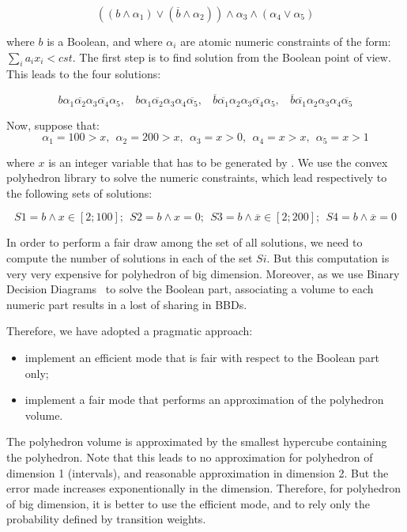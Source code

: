 $$ ((b \wedge \alpha_1) \vee (\overline{b} \wedge \alpha_2)) \wedge \alpha_3 \wedge (\alpha_4 \vee \alpha_5) $$

where $b$ is a Boolean, and where $\alpha_i$ are atomic numeric
constraints of the form: $\sum_i a_i x_i < cst$.  The first step is to
find solution from the Boolean point of view. This leads to the four solutions:

$$ b \alpha_1 \overline{\alpha_2} \alpha_3 \overline{\alpha_4} \alpha_5, \ \ \ \
 b \alpha_1 \overline{\alpha_2} \alpha_3 \alpha_4 \overline{\alpha_5}, \ \ \ \
 \overline{b} \overline{\alpha_1} \alpha_2 \alpha_3 \overline{\alpha_4} \alpha_5, \ \ \ \ 
 \overline{b} \overline{\alpha_1} \alpha_2 \alpha_3 \alpha_4 \overline{\alpha_5}$$

\noindent
Now, suppose that:
$$\alpha_1 = 100 > x, \ \
\alpha_2 = 200 > x, \ \
\alpha_3 = x > 0, \ \
\alpha_4 = x > x, \ \
\alpha_5 = x > 1$$

\noindent
 where $x$ is an integer variable that has to be generated by \lutin. We
 use the convex polyhedron  library to solve the numeric constraints,
 which lead respectively to the following sets of solutions:

$$S1 = b \wedge x \in [2;100]; \ \ 
S2 = b \wedge x = 0; \ \ 
S3 = b \wedge \overline{x} \in [2;200]; \ \ 
S4 = b \wedge \overline{x} = 0 $$


In order  to perform a fair draw  among the set of  all solutions, we
need to compute the number of  solutions in each of the set $Si$. But
this  computation  is  very  very  expensive for  polyhedron  of  big
dimension.  Moreover, as  we use Binary Decision Diagrams~\cite{cudd}
to solve the Boolean part,  associating a volume to each numeric part
results in a lost of sharing in BBDs.

Therefore, we have  adopted a pragmatic approach:
\begin{itemize}
\item implement an efficient mode that is fair with respect to the Boolean part only; 
\item implement a fair mode that performs an approximation of the polyhedron volume.
\end{itemize}

The polyhedron volume is approximated by the smallest hypercube
containing the polyhedron.  Note that this leads to no approximation
for polyhedron of dimension 1 (intervals), and reasonable
approximation in dimension 2. But the error made increases
exponentionally in the dimension.
%
Therefore, for polyhedron of big dimension, it is better to use the
efficient mode, and to rely only the probability defined by
transition weights.



